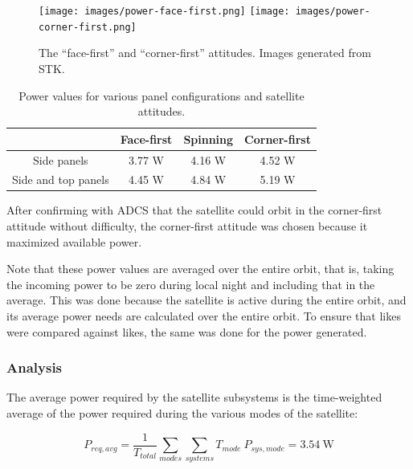 \documentclass[12pt]{article}
\begin{document}
			\begin{figure}[ht]%
\centering
\texttt{[image: images/power-face-first.png]}%
\hspace{0.5in}
\texttt{[image: images/power-corner-first.png]}
\caption{The ``face-first'' and ``corner-first'' attitudes.  Images generated from STK.}%
\label{fig:power-orientations}%
\end{figure}
			
			\begin{table}[ht]
\caption{Power values for various panel configurations and satellite attitudes.}
\label{tab:power-trade-study}
\begin{center}
    \begin{tabular}{|c|c|c|c|} \hline
    	 & Face-first & Spinning & Corner-first \\ \hline
Side panels & 3.77 W & 4.16 W & 4.52 W \\\hline
Side and top panels & 4.45 W & 4.84 W & 5.19 W \\\hline
    \end{tabular}
\end{center}
\end{table}

After confirming with ADCS that the satellite could orbit in the corner-first attitude without difficulty, the corner-first attitude was chosen because it maximized available power.

Note that these power values are averaged over the entire orbit, that is, taking the incoming power to be zero during local night and including that in the average.  This was done because the satellite is active during the entire orbit, and its average power needs are calculated over the entire orbit.  To ensure that likes were compared against likes, the same was done for the power generated.
			
			\subsubsection{Analysis}
			
The average power required by the satellite subsystems is the time-weighted average of the power required during the various modes of the satellite:

\begin{equation}
P_{req,avg} = \frac{1}{T_{total}}\sum_{modes}{ \sum_{systems}{T_{mode} \: P_{sys,mode}} } = 3.54 \ \text{W} 
\label{eq:power-required}
\end{equation}
\end{document}
